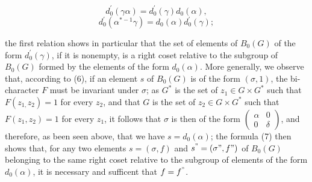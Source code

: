 \documentclass[12pt]{amsart}
\begin{document}
\[
d_{0}^{'}(\gamma\alpha)=d_{0}^{'}(\gamma)d_{0}(\alpha),\]
\[
d_{0}^{'}(\alpha^{*-1}\gamma)=d_{0}(\alpha)d_{0}^{'}(\gamma);\]


the first relation shows in particular that the set of elements of
$B_{0}(G)$ of the form $d_{0}^{'}(\gamma)$, if it is nonempty, is
a right coset relative to the subgroup of $B_{0}(G)$ formed by the
elements of the form $d_{0}(\alpha)$. More generally, we observe
that, according to (6), if an element $s$ of $B_{0}(G)$ is of the
form $(\sigma,1)$, the bi-character $F$ must be invariant under
$\sigma$; as $G^{*}$ is the set of $z_{1}\in G\times G^{*}$ such
that $F(z_{1,}z_{2})=1$ for every $z_{2}$, and that $G$ is the
set of $z_{2}\in G\times G^{*}$ such that $F(z_{1},z_{2})=1$ for
every $z_{1}$, it follows that $\sigma$ is then of the form $\left(\begin{array}{cc}
\alpha & 0\\
0 & \delta\end{array}\right)$, and therefore, as been seen above, that we have $s=d_{0}(\alpha)$;
the formula (7) then shows that, for any two elements $s=(\sigma,f)$
and $s^{"}=(\sigma",f")$ of $B_{0}(G)$ belonging to the same right
coset relative to the subgroup of elements of the form $d_{0}(\alpha)$,
it is necessary and sufficent that $f=f^{"}$.
\end{document}
